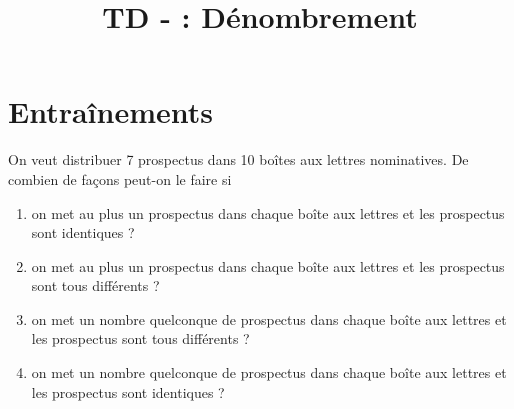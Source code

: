 \documentclass[a4paper, 11pt]{article}
\newcommand{\type}{TD }
\begin{document}
\title{\type -  : Dénombrement}
\section*{Entraînements}
\vspace{0.2cm}


\begin{exercice}  \;
	On veut distribuer 7 prospectus dans 10 bo\^ites aux lettres nominatives. De combien de fa\c{c}ons peut-on le faire si
	\begin{enumerate}
		\item on met au plus un prospectus dans chaque bo\^ite aux lettres et les prospectus sont identiques ?
		\item on met au plus un prospectus dans chaque bo\^ite aux lettres et les prospectus sont tous diff\'erents ?
		\item on met un nombre quelconque de prospectus dans chaque bo\^ite aux lettres et les prospectus sont tous diff\'erents ?
		\item on met un nombre quelconque de prospectus dans chaque bo\^ite aux lettres et les prospectus sont identiques ?
	\end{enumerate}
\end{exercice}
\end{document}
